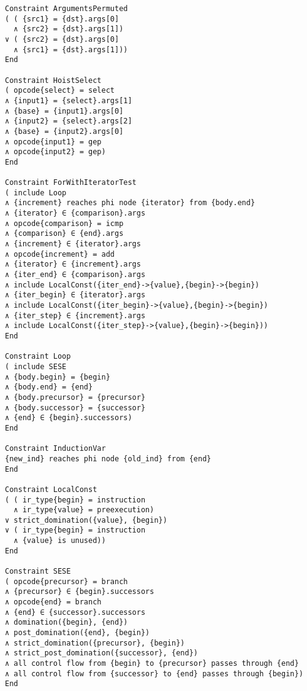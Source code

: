\begin{lstlisting}[language=CAnDL]
Constraint ArgumentsPermuted
( ( {src1} = {dst}.args[0]
  ∧ {src2} = {dst}.args[1])
∨ ( {src2} = {dst}.args[0]
  ∧ {src1} = {dst}.args[1]))
End

Constraint HoistSelect
( opcode{select} = select
∧ {input1} = {select}.args[1]
∧ {base} = {input1}.args[0]
∧ {input2} = {select}.args[2]
∧ {base} = {input2}.args[0]
∧ opcode{input1} = gep
∧ opcode{input2} = gep)
End

Constraint ForWithIteratorTest
( include Loop
∧ {increment} reaches phi node {iterator} from {body.end}
∧ {iterator} ∈ {comparison}.args
∧ opcode{comparison} = icmp
∧ {comparison} ∈ {end}.args
∧ {increment} ∈ {iterator}.args
∧ opcode{increment} = add
∧ {iterator} ∈ {increment}.args
∧ {iter_end} ∈ {comparison}.args
∧ include LocalConst({iter_end}->{value},{begin}->{begin})
∧ {iter_begin} ∈ {iterator}.args
∧ include LocalConst({iter_begin}->{value},{begin}->{begin})
∧ {iter_step} ∈ {increment}.args
∧ include LocalConst({iter_step}->{value},{begin}->{begin}))
End

Constraint Loop
( include SESE
∧ {body.begin} = {begin}
∧ {body.end} = {end}
∧ {body.precursor} = {precursor}
∧ {body.successor} = {successor}
∧ {end} ∈ {begin}.successors)
End

Constraint InductionVar
{new_ind} reaches phi node {old_ind} from {end}
End

Constraint LocalConst
( ( ir_type{begin} = instruction
  ∧ ir_type{value} = preexecution)
∨ strict_domination({value}, {begin})
∨ ( ir_type{begin} = instruction
  ∧ {value} is unused))
End

Constraint SESE
( opcode{precursor} = branch
∧ {precursor} ∈ {begin}.successors
∧ opcode{end} = branch
∧ {end} ∈ {successor}.successors
∧ domination({begin}, {end})
∧ post_domination({end}, {begin})
∧ strict_domination({precursor}, {begin})
∧ strict_post_domination({successor}, {end})
∧ all control flow from {begin} to {precursor} passes through {end}
∧ all control flow from {successor} to {end} passes through {begin})
End
\end{lstlisting}
